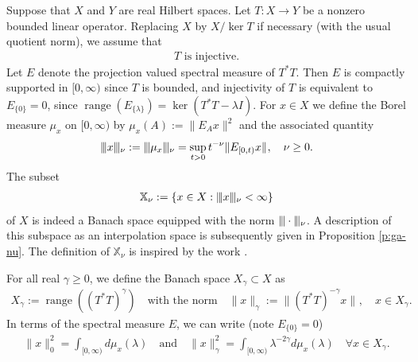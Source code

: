 \documentclass[10pt, a4paper]{iopart}
\newcommand{\IX}{\mathbb{X}}
\newcommand{\norm}[2]{     \| #1       \|_{ #2 }}
\newcommand{\normiii}[2]{\vert\kern-0.25ex\vert\kern-0.25ex\vert #1 \vert\kern-0.25ex \vert\kern-0.25ex\vert_{ #2 }}
\theoremstyle{remark}
\theoremstyle{definition}
\newcommand{\TODO}[1]{\textrm{\color{red}TODO: #1}}
\begin{document}
Suppose that $X$ and $Y$ are real Hilbert spaces.
%
Let $T : X \to Y$ be a nonzero bounded linear operator.
%
Replacing $X$ by $X / \ker T$ if necessary
(with the usual quotient norm),
we assume that
\begin{align}
\label{e:inj}
	\text{$T$ is injective}
	.
\end{align}
%
Let $E$ denote the projection valued spectral measure of $T^* T$.
%
Then $E$ is compactly supported in $[0, \infty)$ since $T$ is bounded,
and injectivity of $T$ is equivalent to $E_{\{0\}} = 0$,
since 
$\mathop{\mathrm{range}}(E_{\{\lambda\}}) = \ker( T^* T - \lambda I)$.
%
For $x \in X$ we define 
the Borel measure $\mu_x$ on $[0, \infty)$
by
$\mu_x(A) := \norm{E_A x}{}^2$
and
the associated quantity
\begin{align}
\label{e:normiii}
	\normiii{x}{\nu} 
	:= 
	\normiii{\mu_x}{\nu}
	=
	\sup_{t > 0}
	t^{-\nu}
	\norm{ E_{[0, t)} x }{}
	,
	\quad
	\nu \geq 0
	.
\end{align}
%
The subset 
\begin{align}
	\IX_\nu :=
	\{
		x \in X:
		\normiii{x}{\nu} < \infty
	\}
\end{align}
of $X$
is indeed a Banach space 
equipped with the norm
$\normiii{\cdot}{\nu}$.
%
A description of this subspace 
as an interpolation space
is subsequently given 
in 
Proposition \ref{p:ga-nu}.
%
%
The definition of $\IX_\nu$ is inspired by 
the work \cite{Neubauer1997}.


%

For all real $\gamma \geq 0$,
we define the Banach space $X_\gamma \subset X$ 
as
\begin{align}
\label{e:Xga}
	X_\gamma := \mathop{\mathrm{range}} ( (T^* T)^\gamma )
	\quad\text{with the norm}\quad
	\norm{x}{\gamma}
	:=
	\norm{ (T^* T)^{-\gamma} x }{},
	\quad
	x \in X_\gamma
	.
\end{align}
%
%
%
%
%
In terms of the spectral measure $E$, we can write
(note $E_{\{0\}} = 0$)
\begin{align}
\label{e:0ga}
	\norm{x}{0}^2
	=
	\int_{[0, \infty)} d \mu_{x}(\lambda)
	\quad\text{and}\quad
	\norm{x}{\gamma}^2
	=
	\int_{[0, \infty)} \lambda^{-2\gamma} d \mu_{x}(\lambda)
	\quad
	\forall
	x \in X_\gamma
	.
\end{align}
%
\end{document}
